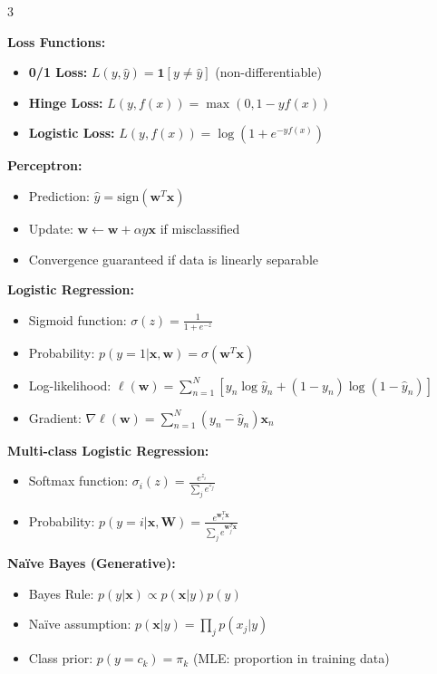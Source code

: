 \documentclass[10pt,landscape]{article}
\begin{document}
\begin{multicols}{3}
\begin{tcolorbox}[breakable, title=Classification, colback=classification, boxsep=1pt, left=1pt, right=1pt, top=1pt, bottom=1pt]
\textbf{Loss Functions:}
\begin{itemize}[leftmargin=*,noitemsep,topsep=0pt]
    \item \textbf{0/1 Loss:} $L(y, \hat{y}) = \mathbf{1}[y \neq \hat{y}]$ (non-differentiable)
    \item \textbf{Hinge Loss:} $L(y, f(x)) = \max(0, 1 - yf(x))$
    \item \textbf{Logistic Loss:} $L(y, f(x)) = \log(1 + e^{-yf(x)})$
\end{itemize}

\textbf{Perceptron:}
\begin{itemize}[leftmargin=*,noitemsep,topsep=0pt]
    \item Prediction: $\hat{y} = \text{sign}(\mathbf{w}^T\mathbf{x})$
    \item Update: $\mathbf{w} \leftarrow \mathbf{w} + \alpha y \mathbf{x}$ if misclassified
    \item Convergence guaranteed if data is linearly separable
\end{itemize}

\textbf{Logistic Regression:}
\begin{itemize}[leftmargin=*,noitemsep,topsep=0pt]
    \item Sigmoid function: $\sigma(z) = \frac{1}{1 + e^{-z}}$
    \item Probability: $p(y=1|\mathbf{x},\mathbf{w}) = \sigma(\mathbf{w}^T\mathbf{x})$
    \item Log-likelihood: $\ell(\mathbf{w}) = \sum_{n=1}^N [y_n\log\hat{y}_n + (1-y_n)\log(1-\hat{y}_n)]$
    \item Gradient: $\nabla \ell(\mathbf{w}) = \sum_{n=1}^N (y_n - \hat{y}_n)\mathbf{x}_n$
\end{itemize}

\textbf{Multi-class Logistic Regression:}
\begin{itemize}[leftmargin=*,noitemsep,topsep=0pt]
    \item Softmax function: $\sigma_i(z) = \frac{e^{z_i}}{\sum_j e^{z_j}}$
    \item Probability: $p(y=i|\mathbf{x},\mathbf{W}) = \frac{e^{\mathbf{w}_i^T\mathbf{x}}}{\sum_j e^{\mathbf{w}_j^T\mathbf{x}}}$
\end{itemize}

\textbf{Naïve Bayes (Generative):}
\begin{itemize}[leftmargin=*,noitemsep,topsep=0pt]
    \item Bayes Rule: $p(y|\mathbf{x}) \propto p(\mathbf{x}|y)p(y)$
    \item Naïve assumption: $p(\mathbf{x}|y) = \prod_j p(x_j|y)$
    \item Class prior: $p(y=c_k) = \pi_k$ (MLE: proportion in training data)
\end{itemize}


\end{tcolorbox}
\end{multicols}
\end{document}
